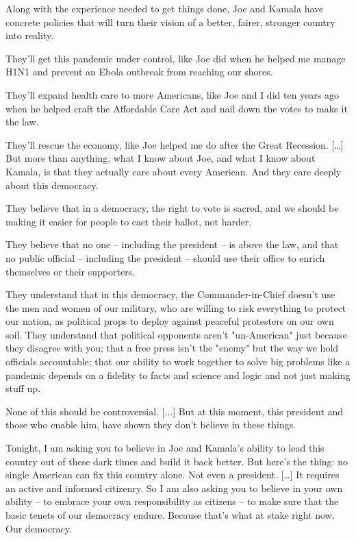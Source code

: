\documentclass[10pt,a4paper]{article}
\begin{document}
Along with the experience needed to get things done, Joe and Kamala have concrete policies that will turn their vision of a better, fairer, stronger country into reality.

They'll get this pandemic under control, like Joe did when he helped me manage H1N1 and prevent an Ebola outbreak from reaching our shores.

They'll expand health care to more Americans, like Joe and I did ten years ago when he helped craft the Affordable Care Act and nail down the votes to make it the law.

They'll rescue the economy, like Joe helped me do after the Great Recession. […] But more than anything, what I know about Joe, and what I know about Kamala, is that they actually care about every American. And they care deeply about this democracy.

They believe that in a democracy, the right to vote is sacred, and we should be making it easier for people to cast their ballot, not harder.

They believe that no one -- including the president -- is above the law, and that no public official -- including the president -- should use their office to enrich themselves or their supporters.

They understand that in this democracy, the Commander-in-Chief doesn't use the men and women of our military, who are willing to risk everything to protect our nation, as political props to deploy against peaceful protesters on our own soil. They understand that political opponents aren't "un-American" just because they disagree with you; that a free press isn't the "enemy" but the way we hold officials accountable; that our ability to work together to solve big problems like a pandemic depends on a fidelity to facts and science and logic and not just making stuff up.

None of this should be controversial. [...] But at this moment, this president and those who enable him, have shown they don't believe in these things.

Tonight, I am asking you to believe in Joe and Kamala's ability to lead this country out of these dark times and build it back better. But here's the thing: no single American can fix this country alone. Not even a president. […] It requires an active and informed citizenry. So I am also asking you to believe in your own ability -- to embrace your own responsibility as citizens -- to make sure that the basic tenets of our democracy endure. Because that's what at stake right now. Our democracy.
\end{document}
